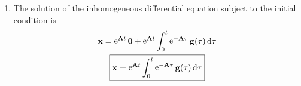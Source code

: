 {\begin{Solution}
\begin{enumerate}
    \begin{gather*}
      \e^{\mathbf{A} t} = \mathbf{S} \e^{\mathbf{J} t} \mathbf{S}^{-1}, \\
      \boxed{
        \e^{\mathbf{A} t} = 
        \begin{pmatrix}
          \e^{2 t} & -(1+t) \e^{2 t} + \e^{3 t} & - \e^{2 t} + \e^{3 t} \\
          0 & \e^{2 t} & 0 \\
          0 & -\e^{2 t} + \e^{3 t} & \e^{3 t}
        \end{pmatrix}.
        }
    \end{gather*}
    The general solution of the homogeneous differential equation is
    \[
    \boxed{
      \mathbf{x} = \e^{\mathbf{A} t } \mathbf{c}.
      }
    \]
  \item
    The solution of the inhomogeneous differential equation subject to the 
    initial condition is
    \begin{gather*}
      \mathbf{x} = \mathop{\mathrm{e}}\nolimits^{\mathbf{A} t } \mathbf{0} 
      + \mathop{\mathrm{e}}\nolimits^{\mathbf{A} t} \int_0^t \mathop{\mathrm{e}}\nolimits^{- \mathbf{A} \tau} \mathbf{g}(\tau) \,\mathrm{d} \tau \\
      \boxed{
        \mathbf{x} = \mathop{\mathrm{e}}\nolimits^{\mathbf{A} t} \int_0^t \mathop{\mathrm{e}}\nolimits^{- \mathbf{A} \tau} \mathbf{g}(\tau) \,\mathrm{d} \tau 
        }
    \end{gather*}
  \end{enumerate}
\end{Solution}







}
